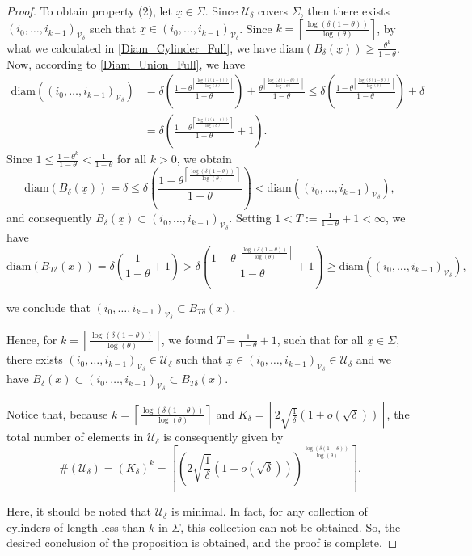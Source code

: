 \documentclass[11pt, reqno]{amsart}
\theoremstyle{plain}%
\theoremstyle{definition}
\theoremstyle{definition}
\def\U{\ensuremath{\mathcal U}}
\def\st{such that }
\def\ulx{\underline{x}}
\numberwithin{equation}{section}
\begin{document}
\begin{proof}
To obtain property (2), let $\ulx\in\Sigma$. Since $\U_{\delta}$ covers $\Sigma$, then there exists $(i_0,\ldots,i_{k-1})_{\mathcal{V}_\delta}$ \st $\ulx\in(i_0,\ldots,i_{k-1})_{\mathcal{V}_\delta}$. Since $k=\left\lceil \frac{\log(\delta(1-\theta))}{\log(\theta)}\right\rceil$, by what we calculated in \eqref{Diam_Cylinder_Full}, we have $\text{diam}(B_\delta(\ulx))\ge\frac{\theta^k}{1-\theta}$. Now, according to \eqref{Diam_Union_Full}, we have \begin{align*}
\text{diam}\left((i_0,\ldots,i_{k-1})_{\mathcal{V}_\delta}\right)&=\delta\left(\frac{1-\theta^{\left\lceil \frac{\log(\delta(1-\theta))}{\log(\theta)}\right\rceil}}{1-\theta}\right)+\frac{\theta^{\left\lceil \frac{\log(\delta(1-\theta))}{\log(\theta)}\right\rceil}}{1-\theta}\le\delta\left(\frac{1-\theta^{\left\lceil \frac{\log(\delta(1-\theta))}{\log(\theta)}\right\rceil}}{1-\theta}\right)+\delta\\&= \delta \left( \frac{1-\theta^{\left\lceil \frac{\log(\delta(1-\theta))}{\log(\theta)}\right\rceil}}{1-\theta}+1\right).
\end{align*} Since $1\le\frac{1-\theta^k}{1-\theta}<\frac{1}{1-\theta}$ for all $k>0$, we obtain $$\text{diam}(B_{\delta}(\ulx))=\delta\le \delta\left(\frac{1-\theta^{\left\lceil \frac{\log(\delta(1-\theta))}{\log(\theta)}\right\rceil}}{1-\theta}\right)< \text{diam}\left((i_0,\ldots,i_{k-1})_{\mathcal{V}_\delta}\right),$$ and consequently $B_{\delta}(\ulx)\subset (i_0,\ldots,i_{k-1})_{\mathcal{V}_\delta}.$
Setting $1<T:= \frac{1}{1-\theta}+1<\infty$, we have 
$$\text{diam}(B_{T\delta}(\ulx))=\delta \left(\frac{1}{1-\theta}+1\right)> \delta\left(\frac{1-\theta^{\left\lceil \frac{\log(\delta(1-\theta))}{\log(\theta)}\right\rceil}}{1-\theta}+1\right)\ge \text{diam}\left((i_0,\ldots,i_{k-1})_{\mathcal{V}_\delta}\right),$$

we conclude that
$(i_0,\ldots,i_{k-1})_{\mathcal{V}_\delta} \subset B_{T\delta}(\ulx).$

Hence, for $k=\left\lceil \frac{\log(\delta(1-\theta))}{\log(\theta)}\right\rceil$, we found $T=\frac{1}{1-\theta}+1$, such that for all $\ulx\in \Sigma$, there exists $(i_0,\ldots,i_{k-1})_{\mathcal{V}_\delta}\in\U_{\delta}$ \st $\ulx\in(i_0,\ldots,i_{k-1})_{\mathcal{V}_\delta}\in\U_{\delta}$ and we have  $B_{\delta}(\ulx)\subset(i_0,\ldots,i_{k-1})_{\mathcal{V}_\delta}\subset B_{T\delta}(\ulx)$.


Notice that, because $k=\left\lceil \frac{\log(\delta(1-\theta))}{\log(\theta)}\right\rceil$ and $K_\delta=\left\lceil2\sqrt{\frac{1}{\delta}}\left(1+o\left(\sqrt{\delta}\right)\right)\right\rceil$, the total number of elements in $\U_{\delta}$ is consequently given by $$\#(\U_{\delta})=(K_\delta)^k=\left\lceil\left(2\sqrt{\frac{1}{\delta}}\left(1+o\left(\sqrt{\delta}\right)\right)\right) ^ { \frac{\log(\delta(1-\theta))}{\log(\theta)}}\right\rceil.$$



Here, it should be noted that $\U_{\delta}$ is minimal. In fact, for any collection of cylinders of length less than $k$ in $\Sigma$, this collection can not be obtained. So, the desired conclusion of the proposition is obtained, and the proof is complete.
\end{proof}
\end{document}

